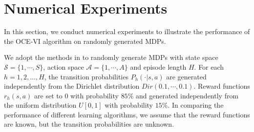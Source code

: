 \documentclass[11pt]{article}
\newcommand{\1}{\mathbbm{1}}
\begin{document}





\section{Numerical Experiments}\label{sec:experiment}
In this section, we conduct numerical experiments to illustrate the performance of the OCE-VI algorithm on randomly generated MDPs. 

We adopt the methods in \citep[Section 4.7]{dann2019strategic} to randomly generate MDPs with state space $\mathcal{S}=\{1,\cdots,S\}$, action space $\mathcal{A}=\{1,\cdots,A\}$ and episode length $H$. For each $h=1, 2, \ldots, H$, the transition probabilities $P_h(\cdot\vert s,a)$ are generated independently from the Dirichlet distribution $Dir(0.1,\cdots,0.1)$. Reward functions $r_h(s,a)$ are set to $0$ with probability $85\%$ and 
generated independently from the uniform distribution $U[0,1]$ with probability $15\%$. In comparing the performance of different learning algorithms, we assume that the reward functions are known, but the transition probabilities are unknown.

\end{document}
